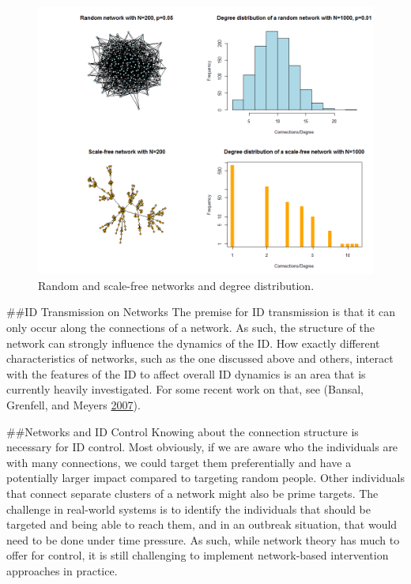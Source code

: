 \documentclass[]{book}
\theoremstyle{definition}
\theoremstyle{definition}
\theoremstyle{definition}
\theoremstyle{remark}
\begin{document}
\begin{figure}
\centering
\includegraphics{./images/network-examples.png}
\caption{\label{fig:network-examples}Random and scale-free networks and
degree distribution.}
\end{figure}

\#\#ID Transmission on Networks The premise for ID transmission is that
it can only occur along the connections of a network. As such, the
structure of the network can strongly influence the dynamics of the ID.
How exactly different characteristics of networks, such as the one
discussed above and others, interact with the features of the ID to
affect overall ID dynamics is an area that is currently heavily
investigated. For some recent work on that, see (Bansal, Grenfell, and
Meyers \protect\hyperlink{ref-bansal07}{2007}).

\#\#Networks and ID Control Knowing about the connection structure is
necessary for ID control. Most obviously, if we are aware who the
individuals are with many connections, we could target them
preferentially and have a potentially larger impact compared to
targeting random people. Other individuals that connect separate
clusters of a network might also be prime targets. The challenge in
real-world systems is to identify the individuals that should be
targeted and being able to reach them, and in an outbreak situation,
that would need to be done under time pressure. As such, while network
theory has much to offer for control, it is still challenging to
implement network-based intervention approaches in practice.
\end{document}
